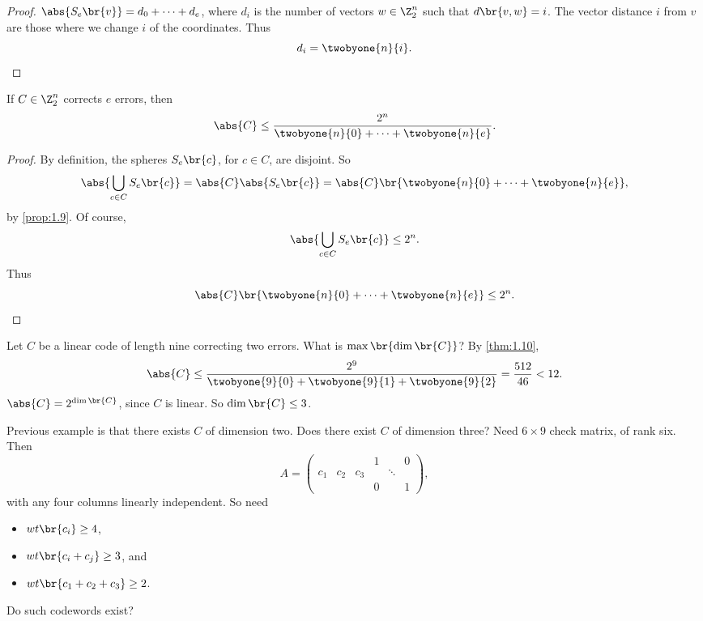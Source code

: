 \begin{proof}
$ \abs{S_e\br{v}} = d_0 + \dots + d_e $, where $ d_i $ is the number of vectors $ w \in \Z_2^n $ such that $ d\br{v, w} = i $. The vector distance $ i $ from $ v $ are those where we change $ i $ of the coordinates. Thus
$$ d_i = \twobyone{n}{i}. $$
\end{proof}

\begin{theorem}
\label{thm:1.10}
If $ C \in \Z_2^n $ corrects $ e $ errors, then
$$ \abs{C} \le \dfrac{2^n}{\twobyone{n}{0} + \dots + \twobyone{n}{e}}. $$
\end{theorem}


\begin{proof}
By definition, the spheres $ S_e\br{c} $, for $ c \in C $, are disjoint. So
$$ \abs{\bigcup_{c \in C} S_e\br{c}} = \abs{C}\abs{S_e\br{c}} = \abs{C}\br{\twobyone{n}{0} + \dots + \twobyone{n}{e}}, $$
by \ref{prop:1.9}. Of course,
$$ \abs{\bigcup_{c \in C} S_e\br{c}} \le 2^n. $$
Thus
$$ \abs{C}\br{\twobyone{n}{0} + \dots + \twobyone{n}{e}} \le 2^n. $$
\end{proof}

\begin{example*}
Let $ C $ be a linear code of length nine correcting two errors. What is $ \max\br{\dim\br{C}} $? By \ref{thm:1.10},
$$ \abs{C} \le \dfrac{2^9}{\twobyone{9}{0} + \twobyone{9}{1} + \twobyone{9}{2}} = \dfrac{512}{46} < 12. $$
$ \abs{C} = 2^{\dim\br{C}} $, since $ C $ is linear. So $ \dim\br{C} \le 3 $.
\end{example*}

Previous example is that there exists $ C $ of dimension two. Does there exist $ C $ of dimension three? Need $ 6 \times 9 $ check matrix, of rank six. Then
$$ A =
\begin{pmatrix}
& & & 1 & & 0 \\
c_1 & c_2 & c_3 & & \ddots & \\
& & & 0 & & 1
\end{pmatrix},
$$
with any four columns linearly independent. So need
\begin{itemize}
\item $ wt\br{c_i} \ge 4 $,
\item $ wt\br{c_i + c_j} \ge 3 $, and
\item $ wt\br{c_1 + c_2 + c_3} \ge 2 $.
\end{itemize}
Do such codewords exist?

